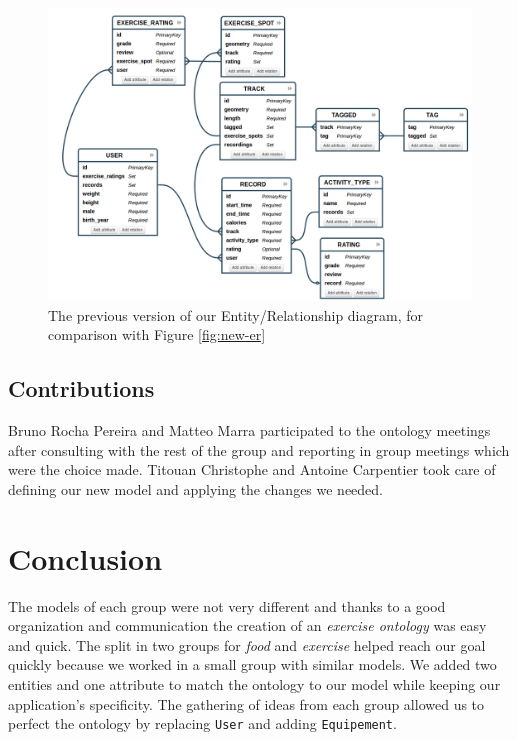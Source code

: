 \documentclass[a4paper]{article}
\begin{document}
\begin{figure}[h!]
  \center
  \includegraphics[width=\textwidth]{../ass2/er-diagram.png}
  \caption{\label{fig:old-er} The previous version of our Entity/Relationship diagram, for comparison with Figure \ref{fig:new-er}}
\end{figure}


\subsection{Contributions}
Bruno Rocha Pereira and Matteo Marra participated to the ontology meetings after consulting with the rest of the group and reporting in group meetings which were the choice made. 
Titouan Christophe and Antoine Carpentier took care of defining our new model and applying the changes we needed. 

\section{Conclusion}
The models of each group were not very different and thanks to a good organization and communication the creation of an \textit{exercise ontology} was easy and quick. The split in two groups for \textit{food} and \textit{exercise} helped reach our goal quickly because we worked in a small group with similar models.
We added two entities and one attribute to match the ontology to our model while keeping our application's specificity.
The gathering of ideas from each group allowed us to perfect the ontology by replacing \texttt{User} and adding \texttt{Equipement}.
\end{document}
